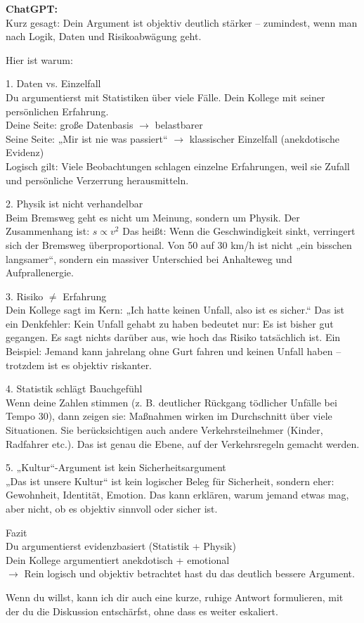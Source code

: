 \begin{kichat}
\textbf{ChatGPT:}\\
Kurz gesagt: Dein Argument ist objektiv deutlich stärker – zumindest, wenn man nach Logik, Daten und Risikoabwägung geht.

Hier ist warum:

1. Daten vs. Einzelfall\\
Du argumentierst mit Statistiken über viele Fälle. Dein Kollege mit seiner persönlichen Erfahrung.\\
Deine Seite: große Datenbasis $\rightarrow$ belastbarer\\
Seine Seite: „Mir ist nie was passiert“ $\rightarrow$ klassischer Einzelfall (anekdotische Evidenz)\\
Logisch gilt: Viele Beobachtungen schlagen einzelne Erfahrungen, weil sie Zufall und persönliche Verzerrung herausmitteln.

2. Physik ist nicht verhandelbar\\
Beim Bremsweg geht es nicht um Meinung, sondern um Physik. Der Zusammenhang ist:
$s \propto v^2$
Das heißt: Wenn die Geschwindigkeit sinkt, verringert sich der Bremsweg überproportional. Von 50 auf 30 km/h ist nicht „ein bisschen langsamer“, sondern ein massiver Unterschied bei Anhalteweg und Aufprallenergie.

3. Risiko $\neq$ Erfahrung\\
Dein Kollege sagt im Kern: „Ich hatte keinen Unfall, also ist es sicher.“ Das ist ein Denkfehler: Kein Unfall gehabt zu haben bedeutet nur: Es ist bisher gut gegangen. Es sagt nichts darüber aus, wie hoch das Risiko tatsächlich ist. Ein Beispiel: Jemand kann jahrelang ohne Gurt fahren und keinen Unfall haben – trotzdem ist es objektiv riskanter.

4. Statistik schlägt Bauchgefühl\\
Wenn deine Zahlen stimmen (z. B. deutlicher Rückgang tödlicher Unfälle bei Tempo 30), dann zeigen sie: Maßnahmen wirken im Durchschnitt über viele Situationen. Sie berücksichtigen auch andere Verkehrsteilnehmer (Kinder, Radfahrer etc.). Das ist genau die Ebene, auf der Verkehrsregeln gemacht werden.

5. „Kultur“-Argument ist kein Sicherheitsargument\\
„Das ist unsere Kultur“ ist kein logischer Beleg für Sicherheit, sondern eher: Gewohnheit, Identität, Emotion. Das kann erklären, warum jemand etwas mag, aber nicht, ob es objektiv sinnvoll oder sicher ist.

Fazit\\
Du argumentierst evidenzbasiert (Statistik + Physik)\\
Dein Kollege argumentiert anekdotisch + emotional\\
$\rightarrow$ Rein logisch und objektiv betrachtet hast du das deutlich bessere Argument.

Wenn du willst, kann ich dir auch eine kurze, ruhige Antwort formulieren, mit der du die Diskussion entschärfst, ohne dass es weiter eskaliert.
\end{kichat}

